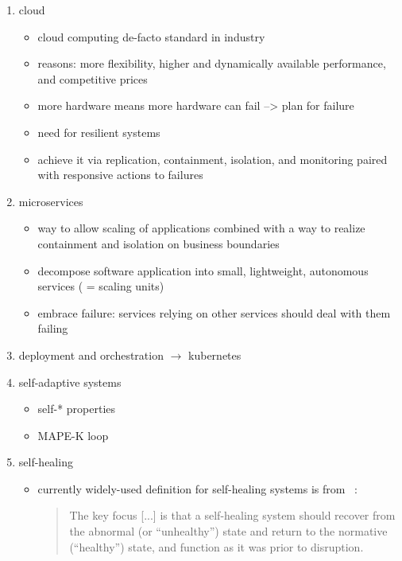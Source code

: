 \begin{enumerate}
  \item cloud
  \begin{itemize}
    \item cloud computing de-facto standard in industry
    \item reasons: more flexibility, higher and dynamically available performance, and competitive prices~\cite{ToffettiMicroservices}
    \item more hardware means more hardware can fail --> plan for failure~\cite{microservices}
    \item need for resilient systems~\cite{reactivemanifesto}
    \item achieve it via replication, containment, isolation, and monitoring paired with responsive actions to failures
  \end{itemize}
  
  \item microservices
  \begin{itemize}
    \item way to allow scaling of applications combined with a way to realize containment and isolation on business boundaries
    \item decompose software application into small, lightweight, autonomous services ( = scaling units)
    \item embrace failure: services relying on other services should deal with them failing~\cite{microservices}
  \end{itemize}
  
  \item deployment and orchestration $\rightarrow$ \gls{kubernetes}
  
  \item self-adaptive systems
  \begin{itemize}
    \item self-* properties
    \item MAPE-K loop
  \end{itemize}
  
  \item self-healing
  \begin{itemize}
    \item currently widely-used definition for self-healing systems is from \citeauthor{Ghosh}~\cite{Ghosh}:
    \begin{quote}
      The key focus [...] is that a self-healing system should recover from the abnormal (or \enquote{unhealthy}) state and return to the normative (\enquote{healthy}) state, and function as it was prior to disruption.
    \end{quote}
    

\end{itemize}
\end{enumerate}
